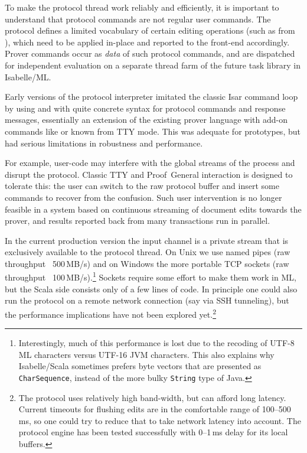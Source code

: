 \begin{isabellebody}
\begin{isamarkuptext}
\begin{itemize}
  \end{itemize}

  To make the protocol thread work reliably and efficiently, it is
  important to understand that protocol commands are not regular user
  commands.  The protocol defines a limited vocabulary of certain
  editing operations (such as  from
  ), which need to be applied in-place and
  reported to the front-end accordingly.  Prover commands occur as
  \emph{data} of such protocol commands, and are dispatched for
  independent evaluation on a separate thread farm of the future task
  library in Isabelle/ML.

   Early versions of the protocol
  interpreter imitated the classic Isar command loop by using  and  with quite concrete syntax for protocol
  commands and response messages, essentially an extension of the
  existing prover language with add-on commands like \isa{{\isasymUNDO}}
  or \isa{{\isasymREDO}} known from TTY mode.  This was adequate for
  prototypes, but had serious limitations in robustness and
  performance.

  For example, user-code may interfere with the global  streams of the process and disrupt the protocol.
  Classic TTY and Proof~General interaction is designed to tolerate
  this: the user can switch to the raw protocol buffer and insert some
  commands to recover from the confusion.  Such user intervention is
  no longer feasible in a system based on continuous streaming of
  document edits towards the prover, and results reported back from
  many transactions run in parallel.

  \medskip In the current production version the input channel is a
  private stream that is exclusively available to the protocol thread.
  On Unix we use named pipes (raw throughput \isa{{\isasymapprox}}~500\,MB/s)
  and on Windows the more portable TCP sockets (raw throughput \isa{{\isasymapprox}}~100\,MB/s).\footnote{Interestingly, much of this performance is
  lost due to the recoding of UTF-8 ML characters versus UTF-16 JVM
  characters.  This also explains why Isabelle/Scala sometimes prefers
  byte vectors that are presented as \texttt{CharSequence}, instead of
  the more bulky \texttt{String} type of Java.} Sockets require some
  effort to make them work in ML, but the Scala side consists only of
  a few lines of code.  In principle one could also run the protocol
  on a remote network connection (say via SSH tunneling), but the
  performance implications have not been explored yet.\footnote{The
  protocol uses relatively high band-width, but can afford long
  latency.  Current timeouts for flushing edits are in the comfortable
  range of 100--500\,ms, so one could try to reduce that to take
  network latency into account.  The protocol engine has been tested
  successfully with 0--1\,ms delay for its local buffers.}


\end{isamarkuptext}
\end{isabellebody}
